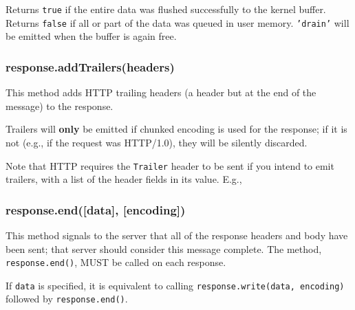 Returns \texttt{true} if the entire data was flushed successfully to the
kernel buffer. Returns \texttt{false} if all or part of the data was
queued in user memory. \texttt{'drain'} will be emitted when the buffer
is again free.

\subsubsection{response.addTrailers(headers)}

This method adds HTTP trailing headers (a header but at the end of the
message) to the response.

Trailers will \textbf{only} be emitted if chunked encoding is used for
the response; if it is not (e.g., if the request was HTTP/1.0), they
will be silently discarded.

Note that HTTP requires the \texttt{Trailer} header to be sent if you
intend to emit trailers, with a list of the header fields in its value.
E.g.,

\begin{Shaded}
\begin{Highlighting}[]
\NormalTok{(}\NormalTok{, \{ }\NormalTok{: }\NormalTok{,}
                          \NormalTok{: } \NormalTok{\});}
\NormalTok{(\{}\NormalTok{: }\NormalTok{\});}
\NormalTok{();}
\end{Highlighting}
\end{Shaded}

\subsubsection{response.end({[}data{]}, {[}encoding{]})}

This method signals to the server that all of the response headers and
body have been sent; that server should consider this message complete.
The method, \texttt{response.end()}, MUST be called on each response.

If \texttt{data} is specified, it is equivalent to calling
\texttt{response.write(data, encoding)} followed by
\texttt{response.end()}.


